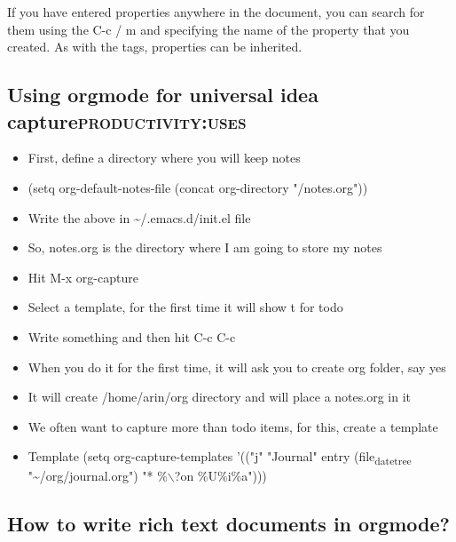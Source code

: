 \documentclass[11pt]{article}
\begin{document}
If you have entered properties anywhere in the document, you can search for them using the C-c / m and specifying the name of the property that you created. As with the tags, properties can be inherited.

\subsection{Using orgmode for universal idea capture\hfill{}\textsc{productivity:uses}}
\label{sec:orga85b433}

\begin{itemize}
\item First, define a directory where you will keep notes
\item (setq org-default-notes-file (concat org-directory "/notes.org"))
\item Write the above in \textasciitilde{}/.emacs.d/init.el file
\item So, notes.org is the directory where I am going to store my notes
\item Hit M-x org-capture
\item Select a template, for the first time it will show t for todo
\item Write something and then hit C-c C-c
\item When you do it for the first time, it will ask you to create org folder, say yes
\item It will create /home/arin/org directory and will place a notes.org in it
\item We often want to capture more than todo items, for this, create a template
\item Template (setq org-capture-templates
'(("j" "Journal" entry (file\textsubscript{datetree} "\textasciitilde{}/org/journal.org")
   "* \%$\backslash$?\nEntered on \%U\n \%i\n \%a")))
\end{itemize}


\subsection{How to write rich text documents in orgmode?}
\label{sec:orgd4428ad}
\end{document}
